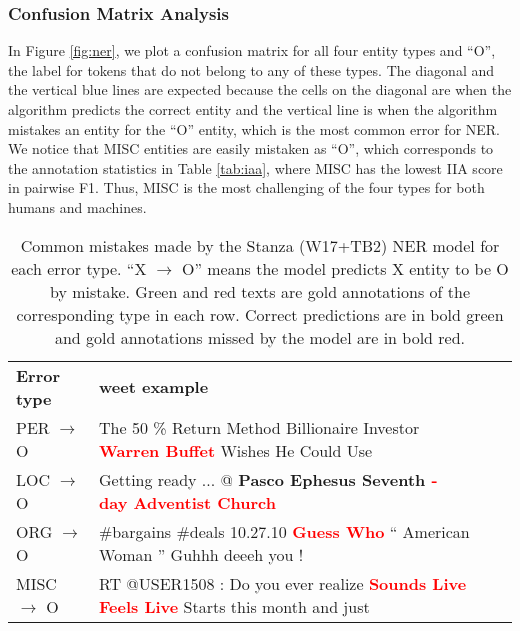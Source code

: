 \documentclass[10pt, a4paper]{article}
\begin{document}
\subsubsection{Confusion Matrix Analysis}
In Figure \ref{fig:ner}, we plot a confusion matrix for all four entity types and ``O'', the label for tokens that do not belong to any of these types.  The diagonal and the vertical blue lines are expected because the cells on the diagonal are when the algorithm predicts the correct entity and the vertical line is when the algorithm mistakes an entity for the ``O'' entity, which is the most common error for NER. We notice that MISC entities are easily mistaken as ``O'', which corresponds to the annotation statistics in Table \ref{tab:iaa}, where MISC has the lowest IIA score in pairwise F1. Thus, MISC is the most challenging of the four types for both humans and machines. 


\begin{table*}[ht]
\centering
\begin{tabular}{l|lll}
\textbf{Error type}                   & \textbf{ weet example} \\ \Xhline{2\arrayrulewidth} 
PER $\rightarrow$ O                & The 50 \% Return Method Billionaire Investor \textbf{\textcolor{red}{Warren Buffet}} Wishes He Could Use &  &  \\

LOC $\rightarrow$ O                & Getting ready ... @ \textbf{\textcolor{ao(english)}{Pasco Ephesus Seventh} \textcolor{red}{- day Adventist Church}}                       &  &   \\

ORG $\rightarrow$ O                & \#bargains \#deals 10.27.10 \textcolor{red}{\textbf{Guess Who}} `` American Woman '' Guhhh deeeh you !                             &  &   \\

MISC $\rightarrow$ O & RT @USER1508 : Do you ever realize \textcolor{red}{\textbf{Sounds Live Feels Live}} Starts this month and just                                       &  &   
\end{tabular}
\caption{Common mistakes made by the Stanza (W17+TB2) NER model for each error type. ``X $\rightarrow$ O'' means the model predicts X entity to be O by mistake. Green and red texts are gold annotations of the corresponding type in each row. Correct predictions are in bold green and gold annotations missed by the model are in bold red.}
\label{tab:examples}
\end{table*}
\end{document}
